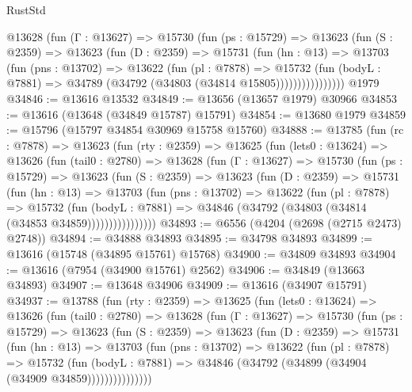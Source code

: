 \begin{lexlean}{RustStd}
\begin{coremodule}
            @13628
              (fun (Γ : @13627) =>
              @15730
                (fun (ps : @15729) =>
                @13623
                  (fun (S : @2359) =>
                  @13623
                    (fun (D : @2359) =>
                    @15731
                      (fun (hn : @13) =>
                      @13703
                        (fun (pns : @13702) =>
                        @13622
                          (fun (pl : @7878) =>
                          @15732
                            (fun (bodyL : @7881) =>
                            @34789 (@34792 (@34803 (@34814 @15805))))))))))))))))
    @1979
@34846 := @13616 @13532
@34849 := @13656 (@13657 @1979) @30966
@34853 := @13616 (@13648 (@34849 @15787) @15791)
@34854 := @13680 @1979
@34859 := @15796 (@15797 @34854 @30969 @15758 @15760)
@34888 := @13785
    (fun (rc : @7878) =>
    @13623
      (fun (rty : @2359) =>
      @13625
        (fun (lets0 : @13624) =>
        @13626
          (fun (tail0 : @2780) =>
          @13628
            (fun (Γ : @13627) =>
            @15730
              (fun (ps : @15729) =>
              @13623
                (fun (S : @2359) =>
                @13623
                  (fun (D : @2359) =>
                  @15731
                    (fun (hn : @13) =>
                    @13703
                      (fun (pns : @13702) =>
                      @13622
                        (fun (pl : @7878) =>
                        @15732
                          (fun (bodyL : @7881) =>
                          @34846 (@34792 (@34803 (@34814 (@34853 @34859))))))))))))))))
@34893 := @6556 (@4204 (@2698 (@2715 @2473) @2748))
@34894 := @34888 @34893
@34895 := @34798 @34893
@34899 := @13616 (@15748 (@34895 @15761) @15768)
@34900 := @34809 @34893
@34904 := @13616 (@7954 (@34900 @15761) @2562)
@34906 := @34849 (@13663 @34893)
@34907 := @13648 @34906
@34909 := @13616 (@34907 @15791)
@34937 := @13788
    (fun (rty : @2359) =>
    @13625
      (fun (lets0 : @13624) =>
      @13626
        (fun (tail0 : @2780) =>
        @13628
          (fun (Γ : @13627) =>
          @15730
            (fun (ps : @15729) =>
            @13623
              (fun (S : @2359) =>
              @13623
                (fun (D : @2359) =>
                @15731
                  (fun (hn : @13) =>
                  @13703
                    (fun (pns : @13702) =>
                    @13622
                      (fun (pl : @7878) =>
                      @15732
                        (fun (bodyL : @7881) =>
                        @34846 (@34792 (@34899 (@34904 (@34909 @34859)))))))))))))))

\end{coremodule}
\end{lexlean}
